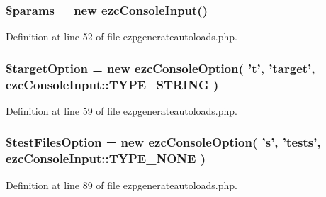 \hypertarget{ezpgenerateautoloads_8php_afe68e6fbe7acfbffc0af0c84a1996466}{
\subsubsection[{\$params}]{\setlength{\rightskip}{0pt plus 5cm}\$params = new ezc\-Console\-Input()}}\label{ezpgenerateautoloads_8php_afe68e6fbe7acfbffc0af0c84a1996466}


\-Definition at line 52 of file ezpgenerateautoloads.\-php.

\hypertarget{ezpgenerateautoloads_8php_a6b7b596c6eccab7f3c39bbcad2d711a0}{
\subsubsection[{\$target\-Option}]{\setlength{\rightskip}{0pt plus 5cm}\$target\-Option = new ezc\-Console\-Option( 't', 'target', ezc\-Console\-Input\-::\-T\-Y\-P\-E\-\_\-\-S\-T\-R\-I\-N\-G )}}\label{ezpgenerateautoloads_8php_a6b7b596c6eccab7f3c39bbcad2d711a0}


\-Definition at line 59 of file ezpgenerateautoloads.\-php.

\hypertarget{ezpgenerateautoloads_8php_a42bc54b597a301809a0bdbec1c8f1ee6}{
\subsubsection[{\$test\-Files\-Option}]{\setlength{\rightskip}{0pt plus 5cm}\$test\-Files\-Option = new ezc\-Console\-Option( 's', 'tests', ezc\-Console\-Input\-::\-T\-Y\-P\-E\-\_\-\-N\-O\-N\-E )}}\label{ezpgenerateautoloads_8php_a42bc54b597a301809a0bdbec1c8f1ee6}


\-Definition at line 89 of file ezpgenerateautoloads.\-php.

